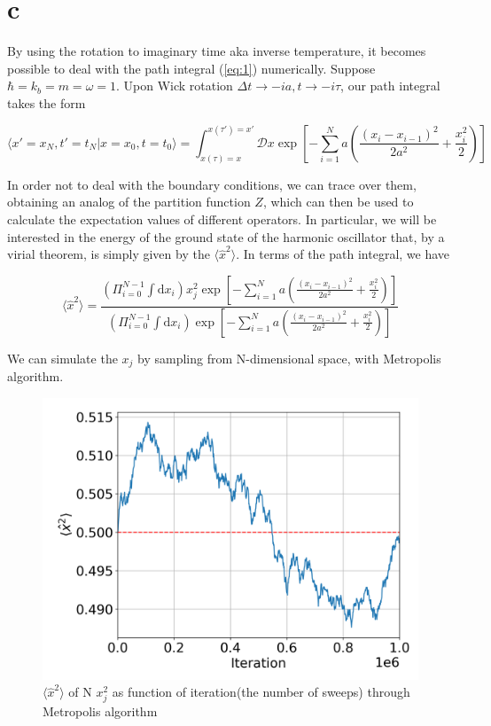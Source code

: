 \section*{c}

By using the rotation to imaginary time aka inverse temperature, it becomes possible to deal with the path integral (\ref{eq:1}) numerically. Suppose $\hbar=k_b=m=\omega=1$. Upon Wick rotation $\Delta t\rightarrow -ia,t\rightarrow-i\tau$, our path integral takes the form

\begin{equation}
    \langle x'=x_N,t'=t_N|x=x_0,t=t_0\rangle = \int_{x(\tau)=x}^{x(\tau')=x'}\mathcal{D}x\exp\left[-\sum_{i=1}^{N}a\left(\frac{(x_{i}-x_{i-1})^2}{2a^2}+\frac{x_i^2}{2}\right)\right]
\end{equation}

In order not to deal with the boundary conditions, we can trace over them, obtaining an analog of the partition function $Z$, which can then be used to calculate the expectation values of different operators. In particular, we will be interested in the energy of the ground state of the harmonic oscillator that, by a virial theorem, is simply given by the $\langle\hat{x}^2\rangle$. In terms of the path integral, we have

\begin{equation}
    \langle\hat{x}^2\rangle = \frac{(\Pi_{i=0}^{N-1}\int \mathrm{d}x_i)x_j^2\exp\left[-\sum_{i=1}^{N}a\left(\frac{(x_{i}-x_{i-1})^2}{2a^2}+\frac{x_i^2}{2}\right)\right]}{(\Pi_{i=0}^{N-1}\int \mathrm{d}x_i)\exp\left[-\sum_{i=1}^{N}a\left(\frac{(x_{i}-x_{i-1})^2}{2a^2}+\frac{x_i^2}{2}\right)\right]}
\end{equation}

We can simulate the $x_j$ by sampling from N-dimensional space, with Metropolis algorithm. 

\begin{figure}
    \centering
    \includegraphics[width=0.6\linewidth]{figures/iterations.png}
    \caption{$\langle\hat{x}^2\rangle$ of N $x_j^2$ as function of iteration(the number of sweeps) through Metropolis algorithm\label{fig:1}}
\end{figure}

